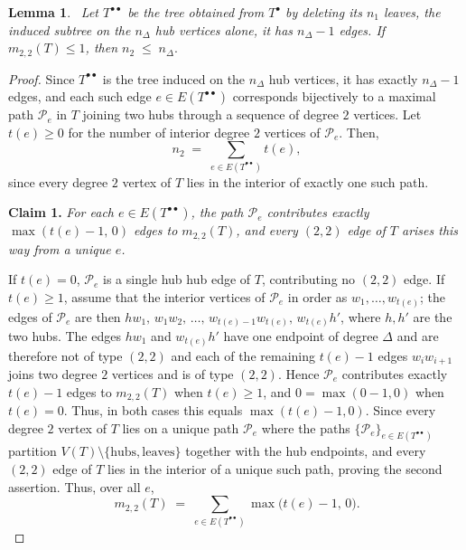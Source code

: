 \documentclass[12pt]{amsart}
\newtheorem{lemma}[theorem]{Lemma}
\begin{document}
\begin{lemma}~\label{lembufferpacking505}
Let $T^{\bullet\bullet}$ be the tree obtained from $T^\bullet$ by deleting its $n_1$ leaves, the induced subtree on the $n_\Delta$ hub vertices alone, it has $n_\Delta-1$ edges. If $m_{2,2}(T)\leqslant 1$, then $n_2 \;\leqslant\; n_\Delta.$
\end{lemma}
\begin{proof}
Since $T^{\bullet\bullet}$ is the tree induced on the $n_\Delta$ hub vertices, it has exactly $n_\Delta-1$ edges, and each such edge
$e\in E(T^{\bullet\bullet})$ corresponds bijectively to a maximal path $\mathcal P_e$ in $T$ joining two hubs through a sequence of
degree $2$ vertices. Let $t(e)\geqslant 0$ for the number of interior degree $2$ vertices of $\mathcal P_e$. Then, 
\begin{equation}~\label{eqq002n2sum}
n_2 \;=\; \sum_{e\in E(T^{\bullet\bullet})} t(e),
\end{equation}
since every degree $2$ vertex of $T$ lies in the interior of exactly one such path.

\smallskip
\noindent\textbf{Claim 1.} \emph{For each $e\in E(T^{\bullet\bullet})$,
the path $\mathcal P_e$ contributes exactly $\max(t(e)-1,\,0)$ edges to $m_{2,2}(T)$, and every $(2,2)$ edge of $T$ arises this way from a unique $e$.}

If $t(e)=0$, $\mathcal P_e$ is a single hub hub edge of $T$, contributing no $(2,2)$ edge. If $t(e)\geqslant 1$, assume that the interior vertices of $\mathcal P_e$ in order
as $w_1,\dots,w_{t(e)}$; the edges of $\mathcal P_e$ are then
$hw_1,\,w_1w_2,\,\dots,\,w_{t(e)-1}w_{t(e)},\,w_{t(e)}h'$, where $h,h'$ are
the two hubs. The edges $hw_1$ and $w_{t(e)}h'$ have one endpoint of degree
$\Delta$ and are therefore not of type $(2,2)$ and each of the remaining $t(e)-1$ edges $w_iw_{i+1}$ joins two degree $2$ vertices and is of type
$(2,2)$. Hence $\mathcal P_e$ contributes exactly $t(e)-1$ edges to $m_{2,2}(T)$ when
$t(e)\geqslant 1$, and $0=\max(0-1,0)$ when $t(e)=0$. Thus, in both cases this equals
$\max(t(e)-1,0)$. Since every degree $2$ vertex of $T$ lies on a unique path $\mathcal P_e$ where the paths $\{\mathcal P_e\}_{e\in E(T^{\bullet\bullet})}$ partition
$V(T)\setminus\{\text{hubs},\text{leaves}\}$ together with the hub
endpoints, and  every $(2,2)$ edge of $T$ lies in the interior of a unique such
path, proving the second assertion. Thus, over all $e$,
\begin{equation}~\label{eqq003m22sum}
m_{2,2}(T) \;=\; \sum_{e\in E(T^{\bullet\bullet})} \max\big(t(e)-1,\,0\big).
\end{equation}


\end{proof}
\end{document}
